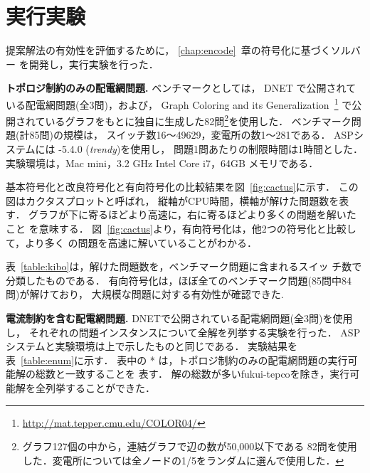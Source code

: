 \chapter{実行実験}\label{chap:exp}


提案解法の有効性を評価するために，
\ref{chap:encode}~章の符号化に基づくソルバー
を開発し，実行実験を行った．

\textbf{トポロジ制約のみの配電網問題.}
ベンチマークとしては，
DNET%
で公開されている配電網問題(全3問)，および，
Graph Coloring and its Generalization~\footnote{\url{http://mat.tepper.cmu.edu/COLOR04/}}
で公開されているグラフをもとに独自に生成した82問\footnote{%
グラフ127個の中から，連結グラフで辺の数が50,000以下である
82問を使用した．変電所については全ノードの1/5をランダムに選んで使用した．}を使用した．
ベンチマーク問題(計85問)の規模は，
スイッチ数16〜49629，変電所の数1〜281である．
%
ASPシステムには {\clingo}-5.4.0 (\textit{trendy})を使用し，
問題1問あたりの制限時間は1時間とした．
実験環境は，Mac mini，3.2 GHz Intel Core i7，64GB メモリである．

基本符号化と改良符号化と有向符号化の比較結果を図~\ref{fig:cactus}に示す．
この図はカクタスプロットと呼ばれ，
縦軸がCPU時間，横軸が解けた問題数を表す．
グラフが下に寄るほどより高速に，右に寄るほどより多くの問題を解いたこと
を意味する．
図~\ref{fig:cactus}より，有向符号化は，他2つの符号化と比較して，より多く
の問題を高速に解いていることがわかる．

表~\ref{table:kibo}は，解けた問題数を，ベンチマーク問題に含まれるスイッ
チ数で分類したものである．
有向符号化は，ほぼ全てのベンチマーク問題(85問中84問)が解けており，
大規模な問題に対する有効性が確認できた. 

\textbf{電流制約を含む配電網問題.}
DNETで公開されている配電網問題(全3問)を使用し，
それぞれの問題インスタンスについて全解を列挙する実験を行った．
ASPシステムと実験環境は上で示したものと同じである．
実験結果を表~\ref{table:enum}に示す．
表中の * は，トポロジ制約のみの配電網問題の実行可能解の総数と一致することを
表す．
解の総数が多い\textsf{fukui-tepco}を除き，実行可能解を全列挙することができた．


